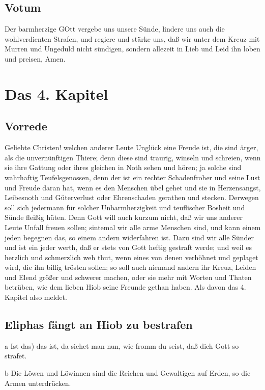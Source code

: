 \section{Votum}

Der barmherzige GOtt vergebe uns unsere Sünde, lindere uns auch die wohlverdienten Strafen, und regiere und stärke uns, daß wir unter dem Kreuz mit Murren und Ungeduld nicht sündigen, sondern allezeit in Lieb und Leid ihn loben und preisen, Amen.

\chapter{Das 4. Kapitel}

\section{Vorrede}

Geliebte Christen! welchen anderer Leute Unglück eine Freude ist, die sind ärger, als die unvernünftigen
 Thiere; denn diese sind traurig, winseln und schreien, wenn sie ihre Gattung oder ihres gleichen in Noth sehen und hören; ja solche sind wahrhaftig Teufelsgenossen, denn der ist ein rechter Schadenfroher und seine Lust und Freude daran hat, wenn es den Menschen übel gehet und sie in Herzensangst, Leibesnoth und Güterverlust oder Ehrenschaden gerathen und stecken. Derwegen soll sich jedermann für solcher Unbarmherzigkeit und teuflischer Bosheit und Sünde fleißig hüten. Denn Gott will auch kurzum nicht, daß wir uns anderer Leute Unfall freuen sollen; sintemal wir alle arme Menschen sind, und kann einem jeden begegnen das, so einem andern widerfahren ist. Dazu sind wir alle Sünder und ist ein jeder werth, daß er stets von Gott heftig gestraft werde; und weil es herzlich und schmerzlich weh thut, wenn eines von denen verhöhnet und geplaget wird, die ihn billig trösten sollen; so soll auch niemand andern ihr Kreuz, Leiden und Elend größer und schwerer machen, oder sie mehr mit Worten und Thaten betrüben, wie dem lieben Hiob seine Freunde gethan haben. Als davon das 4. Kapitel also meldet.

\section{Eliphas fängt an Hiob zu bestrafen}

a Ist das) das ist, da siehet man nun, wie fromm du seist, daß dich Gott so strafet.

b Die Löwen und Löwinnen sind die Reichen und Gewaltigen auf Erden, so die Armen unterdrücken.


